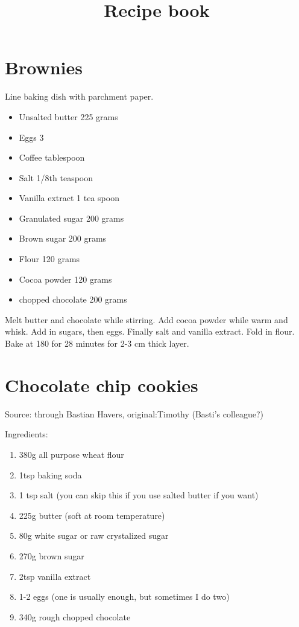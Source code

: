 \documentclass[a4paper,10pt]{article}
\title{Recipe book}
\author{}
\begin{document}
\maketitle
\section{Brownies}
Line baking dish with parchment paper.
\begin{itemize}
 \item Unsalted butter 225 grams
 \item Eggs 3
 \item Coffee tablespoon
 \item Salt 1/8th teaspoon
 \item Vanilla extract 1 tea spoon
 \item Granulated sugar 200 grams
 \item Brown sugar 200 grams
 \item Flour 120 grams
 \item Cocoa powder 120 grams
 \item chopped chocolate 200 grams
\end{itemize}

\vspace{0.5cm}

\noindent Melt butter and chocolate while stirring. Add cocoa powder while warm and whisk. Add in sugars, then eggs. Finally salt and vanilla extract. Fold in flour. Bake at 180 for 28 minutes for 2-3 cm thick layer.

\newpage


\section{Chocolate chip cookies}
Source: through Bastian Havers, original:Timothy (Basti's colleague?)

Ingredients:
\begin{enumerate}
 \item 380g all purpose wheat flour
\item 1tsp baking soda
\item 1 tsp salt (you can skip this if
you use salted butter if you
want)
\item 225g butter (soft at room
temperature)
\item 80g white sugar or raw
crystalized sugar
\item 270g brown sugar
\item 2tsp vanilla extract
\item 1-2 eggs (one is usually
enough, but sometimes I do
two)
\item 340g rough chopped
chocolate
\end{enumerate}
\end{document}

